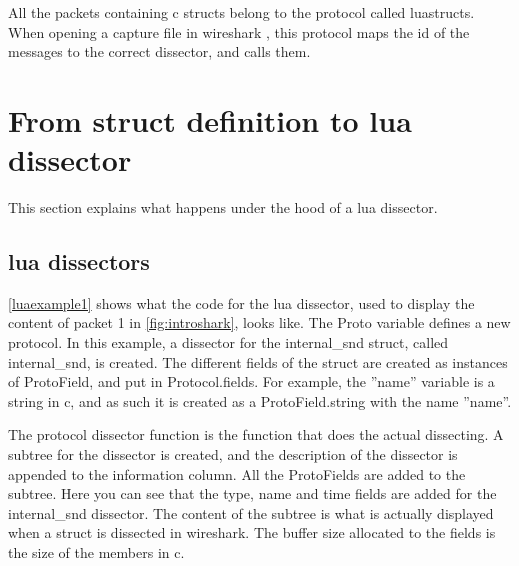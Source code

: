 All the \glspl{packet} containing \Gls{c} \glspl{struct} belong to the \gls{protocol} called luastructs.
When opening a capture file in \Gls{wireshark} , this \gls{protocol} maps the id of the messages to the correct \gls{dissector},
and calls them.



\section{From \Gls{struct} definition to \Gls{lua} \Gls{dissector}}
This section explains what happens under the hood of a \Gls{lua} \gls{dissector}.

\subsection{\Gls{lua} \Glspl{dissector}}
\autoref{luaexample1} shows what the code for the \Gls{lua} \gls{dissector}, used to display the content of \gls{packet} 1 in \autoref{fig:introshark}, looks like.
The Proto variable defines a new \gls{protocol}. In this example, a \gls{dissector} for the internal\_snd \gls{struct}, called internal\_snd, is created. 
The different fields of the \gls{struct} are created as instances of ProtoField, and put in Protocol.fields.
For example, the ''name'' variable is a \gls{string} in \Gls{c}, and as such it is created as a ProtoField.\gls{string} with the 
name ''name''.

The \gls{protocol} \gls{dissector} function is the function that does the actual dissecting.
A subtree for the \gls{dissector} is created, and the description of the \gls{dissector} is appended to the information column.
All the ProtoFields are added to the subtree. Here you can see that the type, name and time fields are added for the internal\_snd \gls{dissector}.
The content of the subtree is what is actually displayed when a \gls{struct} is dissected in \Gls{wireshark}.
The buffer size allocated to the fields is the size of the \glspl{member} in \Gls{c}.

